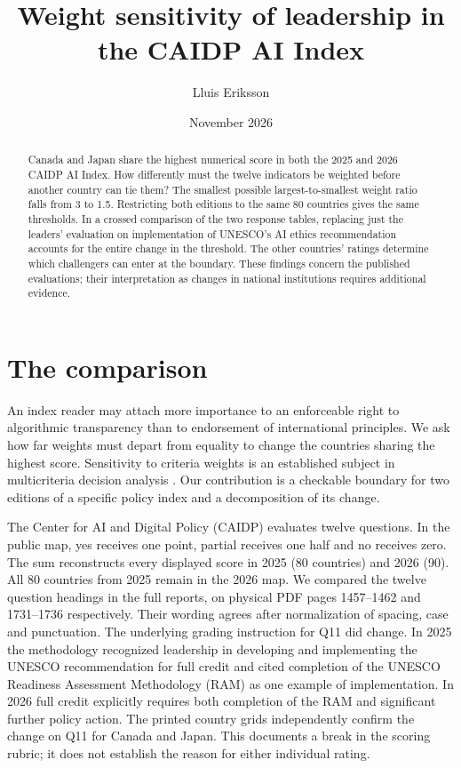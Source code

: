 \documentclass[11pt]{article}
\title{Weight sensitivity of leadership in the CAIDP AI Index}
\author{Lluis Eriksson}
\date{November 2026}
\begin{document}
\maketitle
\begin{abstract}
Canada and Japan share the highest numerical score in both the 2025 and 2026 CAIDP AI Index. How differently must the twelve indicators be weighted before another country can tie them? The smallest possible largest-to-smallest weight ratio falls from 3 to 1.5. Restricting both editions to the same 80 countries gives the same thresholds. In a crossed comparison of the two response tables, replacing just the leaders' evaluation on implementation of UNESCO's AI ethics recommendation accounts for the entire change in the threshold. The other countries' ratings determine which challengers can enter at the boundary. These findings concern the published evaluations; their interpretation as changes in national institutions requires additional evidence.
\end{abstract}

\section{The comparison}
An index reader may attach more importance to an enforceable right to algorithmic transparency than to endorsement of international principles. We ask how far weights must depart from equality to change the countries sharing the highest score. Sensitivity to criteria weights is an established subject in multicriteria decision analysis \cite{mareschal}. Our contribution is a checkable boundary for two editions of a specific policy index and a decomposition of its change.

The Center for AI and Digital Policy (CAIDP) evaluates twelve questions. In the public map, yes receives one point, partial receives one half and no receives zero. The sum reconstructs every displayed score in 2025 (80 countries) and 2026 (90). All 80 countries from 2025 remain in the 2026 map. We compared the twelve question headings in the full reports, on physical PDF pages 1457--1462 and 1731--1736 respectively. Their wording agrees after normalization of spacing, case and punctuation. The underlying grading instruction for Q11 did change. In 2025 the methodology recognized leadership in developing and implementing the UNESCO recommendation for full credit and cited completion of the UNESCO Readiness Assessment Methodology (RAM) as one example of implementation. In 2026 full credit explicitly requires both completion of the RAM and significant further policy action. The printed country grids independently confirm the change on Q11 for Canada and Japan. This documents a break in the scoring rubric; it does not establish the reason for either individual rating.
\end{document}
